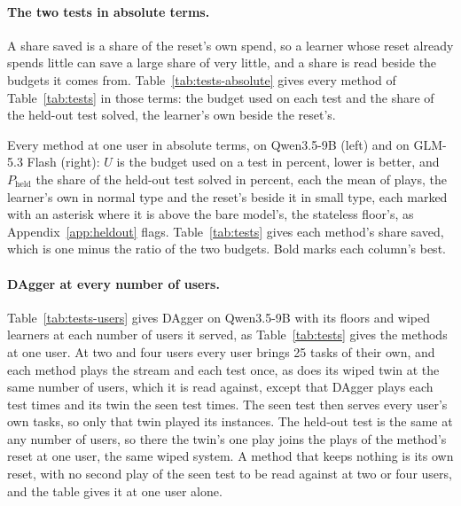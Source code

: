\paragraph{The two tests in absolute terms.}
A share saved is a share of the reset's own spend, so a learner whose reset already spends little can save a large share of very little, and a share is read beside the budgets it comes from. Table~\ref{tab:tests-absolute} gives every method of Table~\ref{tab:tests} in those terms: the budget used on each test and the share of the held-out test solved, the learner's own beside the reset's.

\begin{table}[htbp]
\centering
\footnotesize\setlength{\tabcolsep}{4pt}
\begin{adjustbox}{max width=\linewidth}
}
\end{adjustbox}
\caption{Every method at one user in absolute terms, on Qwen3.5-9B (left) and on GLM-5.3 Flash (right): $U$ is the budget used on a test in percent, lower is better, and $P_{\mathrm{held}}$ the share of the held-out test solved in percent, each the mean of \testPlays{} plays, the learner's own in normal type and the reset's beside it in small type, each marked with an asterisk where it is above the bare model's, the stateless floor's, as Appendix~\ref{app:heldout} flags. Table~\ref{tab:tests} gives each method's share saved, which is one minus the ratio of the two budgets. Bold marks each column's best.}
\label{tab:tests-absolute}
\end{table}

\paragraph{DAgger at every number of users.}
Table~\ref{tab:tests-users} gives DAgger on Qwen3.5-9B with its floors and wiped learners at each number of users it served, as Table~\ref{tab:tests} gives the methods at one user. At two and four users every user brings 25 tasks of their own, and each method plays the stream and each test once, as does its wiped twin at the same number of users, which it is read against, except that DAgger plays each test \testPlays{} times and its twin the seen test \testPlays{} times. The seen test then serves every user's own tasks, so only that twin played its instances. The held-out test is the same at any number of users, so there the twin's one play joins the \testPlays{} plays of the method's reset at one user, the same wiped system. A method that keeps nothing is its own reset, with no second play of the seen test to be read against at two or four users, and the table gives it at one user alone.

